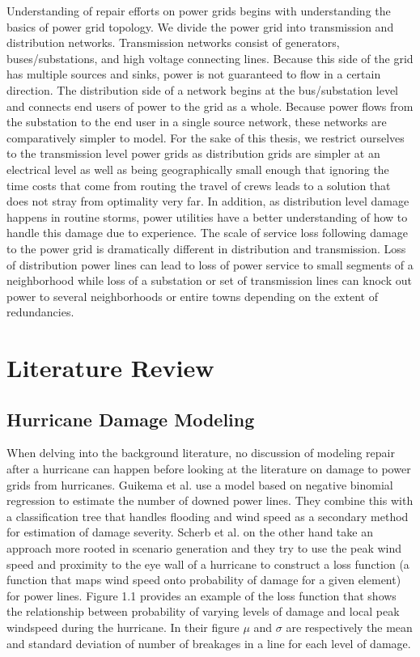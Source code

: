 Understanding of repair efforts on power grids begins with understanding the basics of power grid topology. We divide the power grid into transmission and distribution networks. Transmission networks consist of generators, buses/substations, and high voltage connecting lines. Because this side of the grid has multiple sources and sinks, power is not guaranteed to flow in a certain direction. The distribution side of a network begins at the bus/substation level and connects end users of power to the grid as a whole. Because power flows from the substation to the end user in a single source network, these networks are comparatively simpler to model. For the sake of this thesis, we restrict ourselves to the transmission level power grids as distribution grids are simpler at an electrical level as well as being geographically small enough that ignoring the time costs that come from routing the travel of crews leads to a solution that does not stray from optimality very far. In addition, as distribution level damage happens in routine storms, power utilities have a better understanding of how to handle this damage due to experience. The scale of service loss following damage to the power grid is dramatically different in distribution and transmission. Loss of distribution power lines can lead to loss of power service to small segments of a neighborhood while loss of a substation or set of transmission lines can knock out power to several neighborhoods or entire towns depending on the extent of redundancies.


\section{Literature Review}
\subsection{Hurricane Damage Modeling}
When delving into the background literature, no discussion of modeling repair after a hurricane can happen before looking at the literature on damage to power grids from hurricanes. Guikema et al. \cite{GuikemaEA2010} use a model based on negative binomial regression to estimate the number of downed power lines. They combine this with a classification tree that handles flooding and wind speed as a secondary method for estimation of damage severity. Scherb et al. \cite{ScherbEA2015} on the other hand take an approach more rooted in scenario generation and they try to use the peak wind speed and proximity to the eye wall of a hurricane to construct a loss function (a function that maps wind speed onto probability of damage for a given element) for power lines. Figure 1.1  provides an example of the loss function that shows the relationship between probability of varying levels of damage and local peak windspeed during the hurricane. In their figure $\mu$ and $\sigma$ are respectively the mean and standard deviation of number of breakages in a line for each level of damage.

